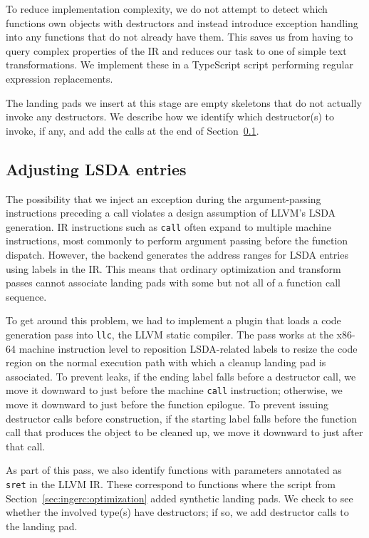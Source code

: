 To reduce implementation complexity, we do not attempt to detect which functions own
objects with destructors and instead introduce exception handling into any functions
that do not already have them.  This saves us from having to query complex properties
of the IR and reduces our task to one of simple text transformations.  We implement
these in a TypeScript script performing regular expression replacements.

The landing pads we insert at this stage are empty skeletons that do not actually
invoke any destructors.  We describe how we identify which destructor(s) to invoke,
if any, and add the calls at the end of Section~\ref{sec:ingerc:codegen}.


\subsection{Adjusting LSDA entries}
\label{sec:ingerc:codegen}

The possibility that we inject an exception during the argument-passing instructions
preceding a call violates a design assumption of LLVM's LSDA generation.  IR
instructions such as \texttt{call} often expand to multiple machine instructions,
most commonly to perform argument passing before the function dispatch.  However, the
backend generates the address ranges for LSDA entries using labels in the IR.  This
means that ordinary optimization and transform passes cannot associate landing pads
with some but not all of a function call sequence.

To get around this problem, we had to implement a plugin that loads a code generation
pass into \texttt{llc}, the LLVM static compiler.  The pass works at the x86-64
machine instruction level to reposition LSDA-related labels to resize the code region
on the normal execution path with which a cleanup landing pad is associated.  To
prevent leaks, if the ending label falls before a destructor call, we move it downward
to just before the machine \texttt{call} instruction; otherwise, we move it downward
to just before the function epilogue.  To prevent issuing destructor calls before
construction, if the starting label falls before the function call that produces the
object to be cleaned up, we move it downward to just after that call.

As part of this pass, we also identify functions with parameters annotated as
\texttt{sret} in the LLVM IR.  These correspond to functions where the script from
Section~\ref{sec:ingerc:optimization} added synthetic landing pads.  We check to see
whether the involved type(s) have destructors; if so, we add destructor calls to the
landing pad.


